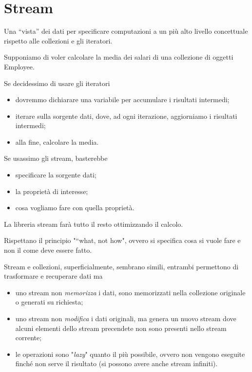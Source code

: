 \chapter{Stream}

Una “vista” dei dati per specificare computazioni a un più alto livello concettuale rispetto alle collezioni e gli iteratori.

Supponiamo di voler calcolare la media dei salari di una collezione di oggetti Employee.
\begin{multicols}{2}
    Se decidessimo di usare gli iteratori
    \begin{itemize}
        \item dovremmo dichiarare una variabile per accumulare i risultati intermedi;
        \item iterare sulla sorgente dati, dove, ad ogni iterazione, aggiorniamo i risultati intermedi;
        \item alla fine, calcolare la media.
    \end{itemize}
    \columnbreak
    Se usassimo gli stream, basterebbe
    \begin{itemize}
        \item specificare la sorgente dati;
        \item la proprietà di interesse;
        \item cosa vogliamo fare con quella proprietà.
    \end{itemize}
    La libreria stream farà tutto il resto ottimizzando il calcolo.
\end{multicols}

Rispettano il principio "“what, not how", ovvero si specifica cosa si vuole fare e non il come deve essere fatto. 

Stream e collezioni, superficialmente, sembrano simili, entrambi permettono di trasformare e recuperare dati ma 
\begin{itemize}
    \item uno stream non \textit{memorizza} i dati, sono memorizzati nella collezione originale o generati su richiesta;
    \item uno stream non \textit{modifica} i dati originali, ma genera un nuovo stream dove alcuni elementi dello stream precendete non sono presenti nello stream 
    corrente;
    \item le operazioni sono "\textit{lazy}" quanto il più possibile, ovvero non vengono eseguite finché non serve il risultato (si possono avere anche 
    stream infiniti).
\end{itemize}

